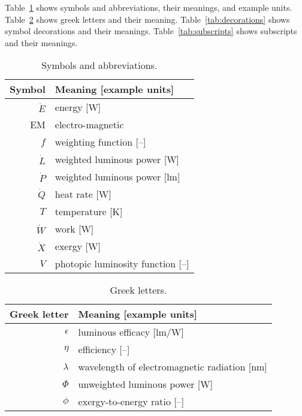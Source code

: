 
\noindent 
Table~\ref{tab:symbols} shows symbols and abbreviations, their meanings, and example units.
Table~\ref{tab:greek} shows greek letters and their meaning.
Table~\ref{tab:decorations} shows symbol decorations and their meanings.
Table~\ref{tab:subscripts} shows subscripts and their meanings.


  
\begin{table}
\centering %
\caption{Symbols and abbreviations.}
\begin{tabular}{r l}
\toprule
Symbol & Meaning [example units] \\
\midrule
$\dot{E}$ & energy [W] \\
EM & electro-magnetic \\
$f$ & weighting function [--] \\
$\dot{L}$ & weighted luminous power [W] \\
$\dot{P}$ & weighted luminous power [lm] \\
$\dot{Q}$ & heat rate [W] \\
$T$ & temperature [K] \\
$\dot{W}$ & work [W] \\
$\dot{X}$ & exergy [W] \\
$V$ & photopic luminosity function [--] \\
\bottomrule
\end{tabular}
\label{tab:symbols}
\end{table}



\begin{table}
\centering %
\caption{Greek letters.}
\begin{tabular}{r l}
  \toprule
  Greek letter & Meaning [example units] \\
  \midrule
  $\epsilon$ & luminous efficacy [lm/W] \\
  $\eta$ & efficiency [--] \\
  $\lambda$ & wavelength of electromagnetic radiation [nm] \\
  $\Phi$ & unweighted luminous power [W] \\
  $\phi$ & exergy-to-energy ratio [--] \\
  \bottomrule
\end{tabular}
\label{tab:greek}
\end{table}


